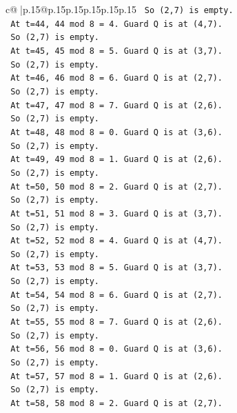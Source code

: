 \documentclass{article}
\begin{document}
{\begin{supertabular}{c@{$\;$}|p{.15\linewidth}@{}p{.15\linewidth}p{.15\linewidth}p{.15\linewidth}p{.15\linewidth}p{.15\linewidth}}
{{{\texttt{    So (2,7) is empty.} \\
\texttt{    At t=44, 44 mod 8 = 4. Guard Q is at (4,7).} \\
\texttt{    So (2,7) is empty.} \\
\texttt{    At t=45, 45 mod 8 = 5. Guard Q is at (3,7).} \\
\texttt{    So (2,7) is empty.} \\
\texttt{    At t=46, 46 mod 8 = 6. Guard Q is at (2,7).} \\
\texttt{    So (2,7) is empty.} \\
\texttt{    At t=47, 47 mod 8 = 7. Guard Q is at (2,6).} \\
\texttt{    So (2,7) is empty.} \\
\texttt{    At t=48, 48 mod 8 = 0. Guard Q is at (3,6).} \\
\texttt{    So (2,7) is empty.} \\
\texttt{    At t=49, 49 mod 8 = 1. Guard Q is at (2,6).} \\
\texttt{    So (2,7) is empty.} \\
\texttt{    At t=50, 50 mod 8 = 2. Guard Q is at (2,7).} \\
\texttt{    So (2,7) is empty.} \\
\texttt{    At t=51, 51 mod 8 = 3. Guard Q is at (3,7).} \\
\texttt{    So (2,7) is empty.} \\
\texttt{    At t=52, 52 mod 8 = 4. Guard Q is at (4,7).} \\
\texttt{    So (2,7) is empty.} \\
\texttt{    At t=53, 53 mod 8 = 5. Guard Q is at (3,7).} \\
\texttt{    So (2,7) is empty.} \\
\texttt{    At t=54, 54 mod 8 = 6. Guard Q is at (2,7).} \\
\texttt{    So (2,7) is empty.} \\
\texttt{    At t=55, 55 mod 8 = 7. Guard Q is at (2,6).} \\
\texttt{    So (2,7) is empty.} \\
\texttt{    At t=56, 56 mod 8 = 0. Guard Q is at (3,6).} \\
\texttt{    So (2,7) is empty.} \\
\texttt{    At t=57, 57 mod 8 = 1. Guard Q is at (2,6).} \\
\texttt{    So (2,7) is empty.} \\
\texttt{    At t=58, 58 mod 8 = 2. Guard Q is at (2,7).} \\
}}}
\end{supertabular}}
\end{document}
